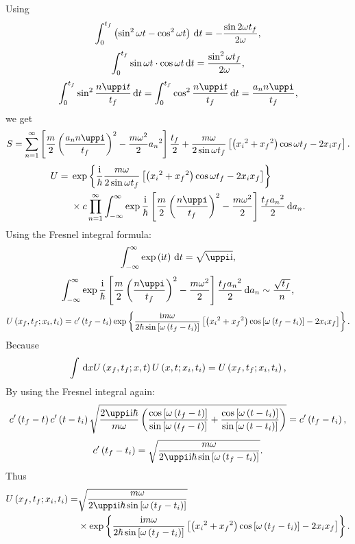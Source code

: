 \documentclass[11pt]{article}
\def\ii{\mathrm{i}}
\newcommand{\dd}{\,\mathrm{d}}
\begin{document}
Using 
\[\int_0^{t_f}\left(\sin^2\omega t-\cos^2\omega t\right)\,\mathrm{d} t=-\frac{\sin2\omega t_f}{2\omega}\text{,}\]
\[\int_0^{t_f}\sin\omega t\cdot\cos\omega t\,\mathrm{d} t=\frac{\sin^2\omega t_f}{2\omega}\text{,}\]
\[\int_0^{t_f}\sin^2\frac{n\piup t}{t_f} \ndd t=\int_0^{t_f}\cos^2\frac{n\piup t}{t_f} \ndd t=\frac{a_n n \piup}{t_f}\ec\]
we get
\[S=\sum_{n=1}^\infty\left[\frac{m}{2}\lb\frac{a_n n \piup}{t_f}\rb^2-\frac{m\omega^2}{2}{a_n}^2\right]\frac{t_f}{2}+\frac{m\omega}{2\sin\omega t_f}\left[\lb {x_i}^2+{x_f}^2\rb\cos\omega t_f-2 x_i x_f\right]\ed\]
\[\begin{split}U={}&\exp\left\{\frac{\ii}{\hbar}\frac{m\omega}{2\sin\omega t_f}\left[\lb {x_i}^2+{x_f}^2\rb\cos\omega t_f-2 x_i x_f\right]\right\}\\%
&{}\times c\prod_{n=1}^{\infty}\int_{-\infty}^\infty\exp{\frac{\ii}{\hbar}\left[\frac{m}{2}\lb\frac{n \piup}{t_f}\rb^2-\frac{m\omega^2}{2}\right]\frac{t_f {a_n}^2}{2}}\ndd a_n\ed\end{split}\]
Using the Fresnel integral formula:
\[\int_{-\infty}^\infty\exp\lb \ii t\rb\ndd t=\sqrt{\piup \ii}\ec\]
\[\int_{-\infty}^\infty\exp{\frac{\ii}{\hbar}\left[\frac{m}{2}\lb\frac{n \piup}{t_f}\rb^2-\frac{m\omega^2}{2}\right]\frac{t_f {a_n}^2}{2}}\ndd a_n\sim\frac{\sqrt{t_f}}{n}\ec\]
\[U\lb x_f,t_f;x_i,t_i\rb=c'\lb t_f-t_i\rb\exp\left\{\frac{\ii m\omega}{2\hbar\sin\left[\omega \lb t_f-t_i\rb\right]}\left[\lb {x_i}^2+{x_f}^2\rb\cos\left[\omega\lb t_f-t_i\rb\right]-2 x_i x_f\right]\right\}\ed\]
Because \[\int\dd x U\lb x_f,t_f;x,t\rb U\lb x,t;x_i,t_i\rb=U\lb x_f,t_f;x_i,t_i\rb\ec\]
By using the Fresnel integral again:
\[c'\lb t_f-t\rb c'\lb t-t_i\rb\sqrt{\frac{2 \piup \ii \hbar}{m \omega}\lb\frac{\cos\left[\omega\lb t_f-t\rb\right]}{\sin\left[\omega\lb t_f-t\rb\right]}+\frac{\cos\left[\omega\lb t-t_i\rb\right]}{\sin\left[\omega\lb t-t_i\rb\right]}\rb}=c'\lb t_f-t_i\rb\ec\]
\[c'\lb t_f-t_i\rb=\sqrt{\frac{m\omega}{2\piup \ii \hbar\sin\left[\omega\lb t_f-t_i\rb\right]}}\ed\]
Thus
\[\begin{split}U\lb x_f,t_f;x_i,t_i\rb=&\sqrt{\frac{m\omega}{2\piup \ii \hbar\sin\left[\omega\lb t_f-t_i\rb\right]}}\\&{}\times\exp\left\{\frac{\ii m\omega}{2\hbar\sin\left[\omega \lb t_f-t_i\rb\right]}\left[\lb {x_i}^2+{x_f}^2\rb\cos\left[\omega\lb t_f-t_i\rb\right]-2 x_i x_f\right]\right\}\ed\end{split}\]
\end{document}
